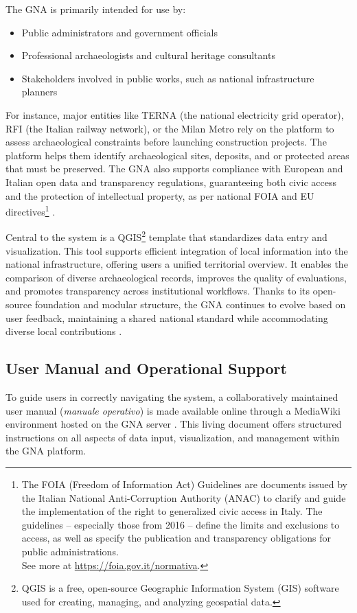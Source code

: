 \begin{spacing}{1.5}
The GNA is primarily intended for use by:
\begin{itemize}
    \item Public administrators and government officials
    \item Professional archaeologists and cultural heritage consultants
    \item Stakeholders involved in public works, such as national infrastructure planners
\end{itemize}

\noindent For instance, major entities like TERNA (the national electricity grid operator), RFI (the Italian railway network), or the Milan Metro rely on the platform to assess archaeological constraints before launching construction projects. The platform helps them identify archaeological sites, deposits, and or protected areas that must be preserved. The GNA also supports compliance with European and Italian open data and transparency regulations, guaranteeing both civic access and the protection of intellectual property, as per national FOIA and EU directives\footnote{The FOIA (Freedom of Information Act) Guidelines are documents issued by the Italian National Anti-Corruption Authority (ANAC) to clarify and guide the implementation of the right to generalized civic access in Italy. The guidelines -- especially those from 2016 -- define the limits and exclusions to access, as well as specify the publication and transparency obligations for public administrations.\\See more at \url{https://foia.gov.it/normativa}.\nocite{noauthor_normativa_2016}} \citep{falcone_dematerializzazione_2023}.

Central to the system is a QGIS\footnote{QGIS is a free, open-source Geographic Information System (GIS) software used for creating, managing, and analyzing geospatial data.} template that standardizes data entry and visualization. This tool supports efficient integration of local information into the national infrastructure, offering users a unified territorial overview. It enables the comparison of diverse archaeological records, improves the quality of evaluations, and promotes transparency across institutional workflows. Thanks to its open-source foundation and modular structure, the GNA continues to evolve based on user feedback, maintaining a shared national standard while accommodating diverse local contributions \citep{calandra_il_2023, boi_il_2023}.

\subsection{User Manual and Operational Support}
To guide users in correctly navigating the system, a collaboratively maintained user manual (\textit{manuale operativo}) is made available online through a MediaWiki environment hosted on the GNA server \citep{gna_wiki_2024}. This living document offers structured instructions on all aspects of data input, visualization, and management within the GNA platform.


\end{spacing}
